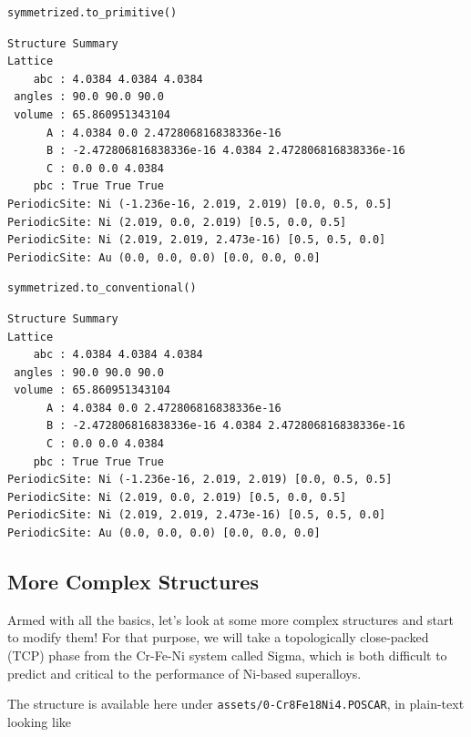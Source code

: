 \begin{verbatim}
symmetrized.to_primitive()
\end{verbatim}

\begin{verbatim}
Structure Summary
Lattice
    abc : 4.0384 4.0384 4.0384
 angles : 90.0 90.0 90.0
 volume : 65.860951343104
      A : 4.0384 0.0 2.472806816838336e-16
      B : -2.472806816838336e-16 4.0384 2.472806816838336e-16
      C : 0.0 0.0 4.0384
    pbc : True True True
PeriodicSite: Ni (-1.236e-16, 2.019, 2.019) [0.0, 0.5, 0.5]
PeriodicSite: Ni (2.019, 0.0, 2.019) [0.5, 0.0, 0.5]
PeriodicSite: Ni (2.019, 2.019, 2.473e-16) [0.5, 0.5, 0.0]
PeriodicSite: Au (0.0, 0.0, 0.0) [0.0, 0.0, 0.0]
\end{verbatim}

\begin{verbatim}
symmetrized.to_conventional()
\end{verbatim}

\begin{verbatim}
Structure Summary
Lattice
    abc : 4.0384 4.0384 4.0384
 angles : 90.0 90.0 90.0
 volume : 65.860951343104
      A : 4.0384 0.0 2.472806816838336e-16
      B : -2.472806816838336e-16 4.0384 2.472806816838336e-16
      C : 0.0 0.0 4.0384
    pbc : True True True
PeriodicSite: Ni (-1.236e-16, 2.019, 2.019) [0.0, 0.5, 0.5]
PeriodicSite: Ni (2.019, 0.0, 2.019) [0.5, 0.0, 0.5]
PeriodicSite: Ni (2.019, 2.019, 2.473e-16) [0.5, 0.5, 0.0]
PeriodicSite: Au (0.0, 0.0, 0.0) [0.0, 0.0, 0.0]
\end{verbatim}

\hypertarget{more-complex-structures}{%
\subsection{More Complex Structures}\label{pysipfenntutorial:more-complex-structures}}

Armed with all the basics, let's look at some more complex structures
and start to modify them! For that purpose, we will take a topologically
close-packed (TCP) phase from the Cr-Fe-Ni system called Sigma, which is
both difficult to predict and critical to the performance of Ni-based
superalloys.

The structure is available here under
\texttt{assets/0-Cr8Fe18Ni4.POSCAR}, in plain-text
looking like

